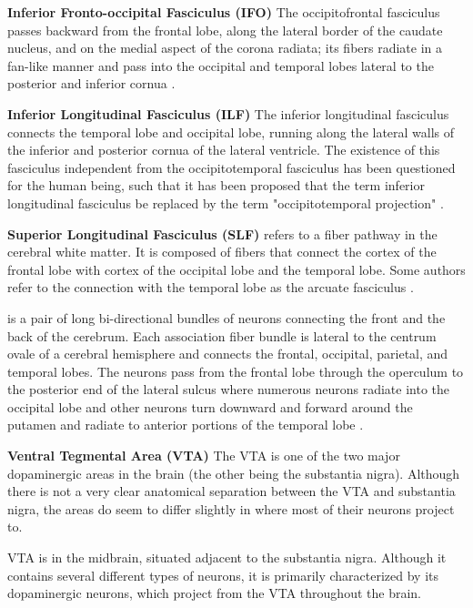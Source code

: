 \documentclass[../structure.tex]{subfiles}
\begin{document}
		\textbf{Inferior Fronto-occipital Fasciculus (IFO)}
		The occipitofrontal fasciculus passes backward from the frontal lobe, along the lateral border of the caudate nucleus, and on the medial aspect of the corona radiata; its fibers radiate in a fan-like manner and pass into the occipital and temporal lobes lateral to the posterior and inferior cornua \cite{PDD2015}.
		
		\textbf{Inferior Longitudinal Fasciculus (ILF)}
		The inferior longitudinal fasciculus connects the temporal lobe and occipital lobe, running along the lateral walls of the inferior and posterior cornua of the lateral ventricle.
The existence of this fasciculus independent from the occipitotemporal fasciculus has been questioned for the human being, such that it has been proposed that the term inferior longitudinal fasciculus be replaced by the term "occipitotemporal projection" \cite{PDD2015}.

		\textbf{Superior Longitudinal Fasciculus (SLF)}
		refers to a fiber pathway in the cerebral white matter. It is composed of fibers that connect the cortex of the frontal lobe with cortex of the occipital lobe and the temporal lobe. Some authors refer to the connection with the temporal lobe as the arcuate fasciculus \cite{Washington1994}.
		
		is a pair of long bi-directional bundles of neurons connecting the front and the back of the cerebrum. Each association fiber bundle is lateral to the centrum ovale of a cerebral hemisphere and connects the frontal, occipital, parietal, and temporal lobes. The neurons pass from the frontal lobe through the operculum to the posterior end of the lateral sulcus where numerous neurons radiate into the occipital lobe and other neurons turn downward and forward around the putamen and radiate to anterior portions of the temporal lobe \cite{PDD2015}.
		
		\textbf{Ventral Tegmental Area (VTA)}
		The VTA is one of the two major dopaminergic areas in the brain (the other being the substantia nigra). Although there is not a very clear anatomical separation between the VTA and substantia nigra, the areas do seem to differ slightly in where most of their neurons project to.
		
		VTA is in the midbrain, situated adjacent to the substantia nigra. Although it contains several different types of neurons, it is primarily characterized by its dopaminergic neurons, which project from the VTA throughout the brain.
		
\end{document}
